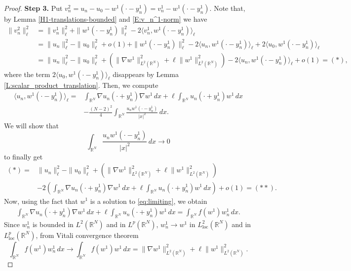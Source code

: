 \documentclass[12pt,leqno,twoside,sort]{amsart}
\newcommand{\R}{\mathbb{R}}
\numberwithin{equation}{section}
\begin{document}
\begin{proof}
\textbf{Step 3.} Put $v_n^2=u_n-u_0-w^1(\cdot - y_n^1)=v_n^1-w^1(\cdot - y_n^1)$. Note that, by Lemma \ref{H1-translations-bounded} and \eqref{E:v_n^1-norm} we have
\begin{equation*}
\begin{split}
\|v_n^2\|^2_{\ell}&=\|v_n^1\|^2_\ell+\|w^1(\cdot-y_n^1)\|^2_\ell - 2\langle v_n^1,w^1(\cdot-y_n^1)\rangle_\ell
\\
&=\|u_n\|^2_\ell-\|u_0\|^2_\ell+o(1)+\|w^1(\cdot -y_n^1)\|^2_\ell
-2\langle u_n,w^1(\cdot -y_n^1)\rangle_\ell
+2\langle u_0,w^1(\cdot -y_n^1)\rangle_\ell\\
&=\|u_n\|^2_\ell-\|u_0\|^2_\ell+\left( \|\nabla w^1\|_{L^2 (\R^N)}^2 + \ell \| w^1 \|_{L^2 (\R^N)}^2 \right) - 2\langle u_n,w^1(\cdot -y_n^1)\rangle_\ell +o(1)=(*),
\end{split}
\end{equation*}
where the term $2\langle u_0,w^1 (\cdot - y_n^1)\rangle_\ell $ disappears by Lemma \ref{L:scalar_product_translation}. Then, we compute
\begin{align*}
\langle u_n, w^1 (\cdot - y_n^1) \rangle_\ell = &\int_{\R^N} \nabla u_n(\cdot + y_n^1) \nabla w^1 \,dx + \ell \int_{\R^N}  u_n(\cdot + y_n^1)  w^1 \,dx \\ &- \frac{(N-2)^2}{4} \int_{\R^N} \frac{u_n w^1 (\cdot - y_n^1)}{|x|^2} \, dx.
\end{align*}
We will show that
\begin{equation}\label{E:temp-new}
\int_{\R^N} \frac{u_n w^1 (\cdot - y_n^1)}{|x|^2} \, dx\to 0
\end{equation}
to finally get
\[
\begin{split}
(*)=&\|u_n\|^2_\ell-\|u_0\|^2_\ell+\left( \|\nabla w^1\|_{L^2 (\R^N)}^2 + \ell \| w^1 \|_{L^2 (\R^N)}^2 \right)\\
&-2 \left( \int_{\R^N} \nabla u_n(\cdot + y_n^1) \nabla w^1 \,dx + \ell \int_{\R^N}  u_n(\cdot + y_n^1)  w^1 \,dx  \right) +o(1) = (**).
\end{split}
\]
Now, using the fact that $w^1$ is a solution to \eqref{eq:limiting}, we obtain
\begin{align}\label{E:temp-new2}
\int_{\R^N} \nabla u_n(\cdot + y_n^1) \nabla w^1 \,dx + \ell \int_{\R^N}  u_n(\cdot + y_n^1)  w^1 \,dx = \int_{\R^N} f(w^1) w_n^1 \, dx.
\end{align}
Since $w_n^1$ is bounded in $L^2 (\R^N)$ and in $L^p (\R^N)$, $w_n^1 \to w^1$ in $L^2_{\mathrm{loc}} (\R^N)$ and in $L^p_{\mathrm{loc}} (\R^N)$, from Vitali convergence theorem
$$
\int_{\R^N} f(w^1) w_n^1 \, dx \to \int_{\R^N} f(w^1) w^1 \, dx = \|\nabla w^1\|_{L^2 (\R^N)}^2 + \ell \| w^1 \|_{L^2 (\R^N)}^2.
$$
\end{proof}
\end{document}
